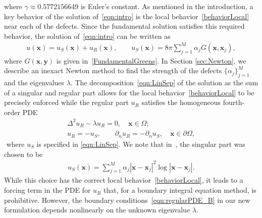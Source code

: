 \documentclass[times]{article}
\newcommand{\xx}{\mathbf{x}}
\newcommand{\yy}{\mathbf{y}}
\newcommand{\bsub}{\begin{subequations}}
\newcommand{\esub}{\end{subequations}$\!$}
\begin{document}
where $\gamma \approx 0.5772156649$ is Euler's constant. As mentioned
in the introduction, a key behavior of the solution
of~\eqref{eqn:intro} is the local behavior~\eqref{behaviorLocal} near
each of the defects.  Since the fundamental solution satisfies this
required behavior, the solution of~\eqref{eqn:intro} can be written as
\begin{align}\label{eqn:LinSep}
  u(\xx) = u_S(\xx)+ u_R(\xx), \qquad u_S(\xx) = 8\pi\sum_{j=1}^M \alpha_j G(\xx,\xx_j),
\end{align}
where $G(\xx,\yy)$ is given in~\eqref{FundamentalGreens}. In Section
\ref{sec:Newton}, we describe an inexact Newton method to find the
strength of the defects $\{\alpha_{j}\}_{j=1}^M$ and the eigenvalues
$\lambda$.  The decomposition~\eqref{eqn:LinSep} of the solution as the
sum of a singular and regular part allows for the local
behavior~\eqref{behaviorLocal} to be precisely enforced while the
regular part $u_R$ satisfies the homogeneous fourth-order PDE
\bsub\label{eqn:regularPDE}
\begin{gather}
  \label{eqn:regularPDE_A}
  \Delta^{2}u_{R} - \lambda u_{R} = 0, \quad \xx \in \Omega; \\[5pt]
  \label{eqn:regularPDE_B}  u_{R} = -u_{S}, \qquad \partial_{n} u_{R} = -\partial_{n} u_{S}, 
  \quad \xx \in \partial \Omega,
\end{gather}
\esub
where $u_S$ is specified in \eqref{eqn:LinSep}. We note that in~\cite{LHS}, the singular part was chosen to be
\begin{align*}
  u_{S}(\xx) = \sum_{j=1}^{M} \alpha_{j} |\xx - \xx_{j}
    |^2\log |\xx - \xx_{j}|.
\end{align*}
While this choice has the correct local behavior~\eqref{behaviorLocal},
it leads to a forcing term in the PDE for $u_R$ that, for a boundary
integral equation method, is prohibitive. However, the boundary
conditions~\eqref{eqn:regularPDE_B} in our new formulation depends
nonlinearly on the unknown eigenvalue $\lambda$.
\end{document}
